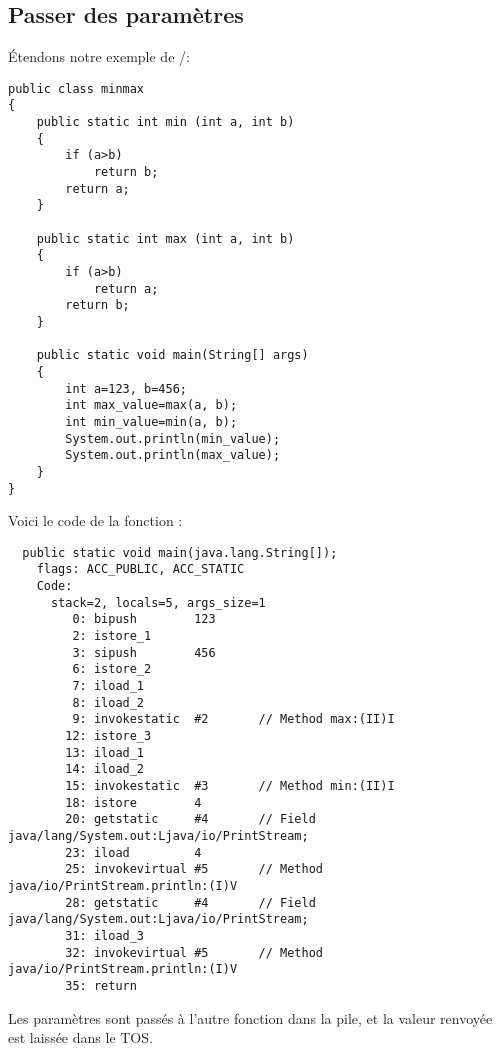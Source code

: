 \subsection{Passer des paramètres}

Étendons notre exemple de /:


\begin{lstlisting}[style=customjava]
public class minmax
{
	public static int min (int a, int b)
	{
		if (a>b)
			return b;
		return a;
	}

	public static int max (int a, int b)
	{
		if (a>b)
			return a;
		return b;
	}

	public static void main(String[] args)
	{
		int a=123, b=456;
		int max_value=max(a, b);
		int min_value=min(a, b);
		System.out.println(min_value);
		System.out.println(max_value);
	}
}
\end{lstlisting}

Voici le code de la fonction \main:


\begin{lstlisting}
  public static void main(java.lang.String[]);
    flags: ACC_PUBLIC, ACC_STATIC
    Code:
      stack=2, locals=5, args_size=1
         0: bipush        123
         2: istore_1      
         3: sipush        456
         6: istore_2      
         7: iload_1       
         8: iload_2       
         9: invokestatic  #2       // Method max:(II)I
        12: istore_3      
        13: iload_1       
        14: iload_2       
        15: invokestatic  #3       // Method min:(II)I
        18: istore        4
        20: getstatic     #4       // Field java/lang/System.out:Ljava/io/PrintStream;
        23: iload         4
        25: invokevirtual #5       // Method java/io/PrintStream.println:(I)V
        28: getstatic     #4       // Field java/lang/System.out:Ljava/io/PrintStream;
        31: iload_3       
        32: invokevirtual #5       // Method java/io/PrintStream.println:(I)V
        35: return        
\end{lstlisting}

Les paramètres sont passés à l'autre fonction dans la pile, et la valeur renvoyée
est laissée dans le \ac{TOS}.

